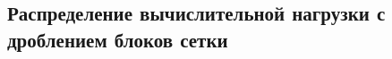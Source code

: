 \subsection{Распределение вычислительной нагрузки с дроблением блоков сетки}

\cite{Rybakov2016WithCut}
